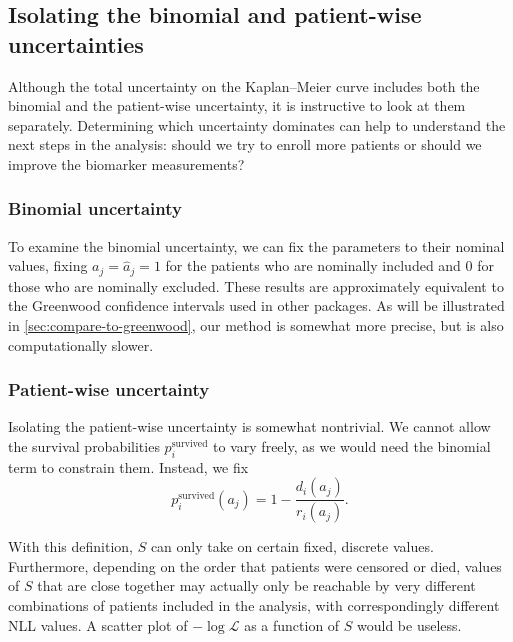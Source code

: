 \documentclass[article]{jss}
\newcommand{\KM}{Kaplan--Meier} %
\begin{document}
\subsection{Isolating the binomial and patient-wise uncertainties}\label{sec:isolating-uncertainties}

Although the total uncertainty on the \KM{} curve includes both the binomial and the patient-wise uncertainty, it is instructive to look at them separately.  Determining which uncertainty dominates can help to understand the next steps in the analysis: should we try to enroll more patients or should we improve the biomarker measurements?

\subsubsection{Binomial uncertainty}

To examine the binomial uncertainty, we can fix the parameters to their nominal values, fixing \(a_j=\hat{a}_j=1\) for the patients who are nominally included and \(0\) for those who are nominally excluded.  These results are approximately equivalent to the Greenwood confidence intervals used in other packages.  As will be illustrated in \cref{sec:compare-to-greenwood}, our method is somewhat more precise, but is also computationally slower.

\subsubsection{Patient-wise uncertainty}

Isolating the patient-wise uncertainty is somewhat nontrivial.  We cannot allow the survival probabilities \(p_i^\text{survived}\) to vary freely, as we would need the binomial term to constrain them.  Instead, we fix
\begin{equation}
p_i^\text{survived}(a_j) = 1 - \frac{d_i(a_j)}{r_i(a_j)}.
\end{equation}

With this definition, \(S\) can only take on certain fixed, discrete values.  Furthermore, depending on the order that patients were censored or died, values of \(S\) that are close together may actually only be reachable by very different combinations of patients included in the analysis, with correspondingly different NLL values.  A scatter plot of \(-\log\mathcal{L}\) as a function of \(S\) would be useless.
\end{document}
